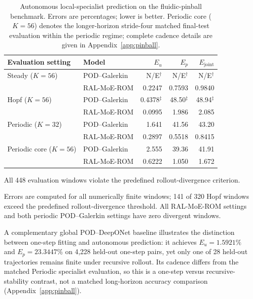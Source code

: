 \begin{table}[t]
\centering
\caption{Autonomous local-specialist prediction on the fluidic-pinball benchmark.
Errors are percentages; lower is better. Periodic core ($K=56$) denotes the
longer-horizon stride-four matched final-test evaluation within the periodic
regime; complete cadence details are given in Appendix~\ref{app:pinball}.}
\label{tab:pinball_autonomous}
\small
\setlength{\tabcolsep}{5pt}
\begin{threeparttable}
\begin{tabular}{@{}llrrr@{}}
\toprule
Evaluation setting & Model & $E_u$ & $E_p$ & $E_{\mathrm{joint}}$ \\
\midrule
Steady ($K=56$) & POD--Galerkin & N/E$^\dagger$ & N/E$^\dagger$ & N/E$^\dagger$ \\
 & RAL-MoE-ROM & 0.2247 & 0.7593 & 0.9840 \\
\addlinespace
Hopf ($K=56$) & POD--Galerkin & 0.4378$^\ddagger$ & 48.50$^\ddagger$ & 48.94$^\ddagger$ \\
 & RAL-MoE-ROM & 0.0995 & 1.986 & 2.085 \\
\addlinespace
Periodic ($K=32$) & POD--Galerkin & 1.641 & 41.56 & 43.20 \\
 & RAL-MoE-ROM & 0.2897 & 0.5518 & 0.8415 \\
\addlinespace
Periodic core ($K=56$) & POD--Galerkin & 2.555 & 39.36 & 41.91 \\
 & RAL-MoE-ROM & 0.6222 & 1.050 & 1.672 \\
\bottomrule
\end{tabular}
\begin{tablenotes}[flushleft]
\footnotesize
\item[$\dagger$] All 448 evaluation windows violate the predefined rollout-divergence criterion.
\item[$\ddagger$] Errors are computed for all numerically finite windows;
141 of 320 Hopf windows exceed the predefined rollout-divergence threshold.
All RAL-MoE-ROM settings and both periodic POD--Galerkin settings have zero divergent windows.
\end{tablenotes}
\end{threeparttable}
\end{table}

\noindent A complementary global POD--DeepONet baseline illustrates the
distinction between one-step fitting and autonomous prediction: it achieves
$E_u=1.5921\%$ and $E_p=23.3447\%$ on 4,228 held-out one-step pairs, yet
only one of 28 held-out trajectories remains finite under recursive rollout.
Its cadence differs from the matched Periodic specialist evaluation, so this
is a one-step versus recursive-stability contrast, not a matched long-horizon
accuracy comparison (Appendix~\ref{app:pinball}).

